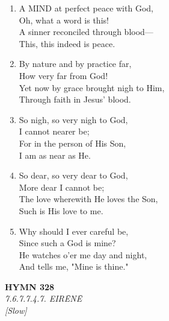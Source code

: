 \documentclass[11pt,a4paper]{article}
\begin{document}
\begin{enumerate}
    \item A MIND at perfect peace with God, \\
        Oh, what a word is this! \\
        A sinner reconciled through blood--- \\
        This, this indeed is peace.

    \item By nature and by practice far, \\
        How very far from God! \\
        Yet now by grace brought nigh to Him, \\
        Through faith in Jesus' blood.

    \item So nigh, so very nigh to God, \\
        I cannot nearer be; \\
        For in the person of His Son, \\
        I am as near as He.

    \item So dear, so very dear to God, \\
        More dear I cannot be; \\
        The love wherewith He loves the Son, \\
        Such is His love to me.

    \item Why should I ever careful be, \\
        Since such a God is mine? \\
        He watches o'er me day and night, \\
        And tells me, "Mine is thine."

\end{enumerate}

\newpage
\begin{center}
    {\Large \textbf{HYMN 328}}
    \\
    \textit{7.6.7.7.4.7. EIRĒNĒ}
    \\
    \textit{\small [Slow]}
\end{center}
\vspace{1em}
\end{document}
